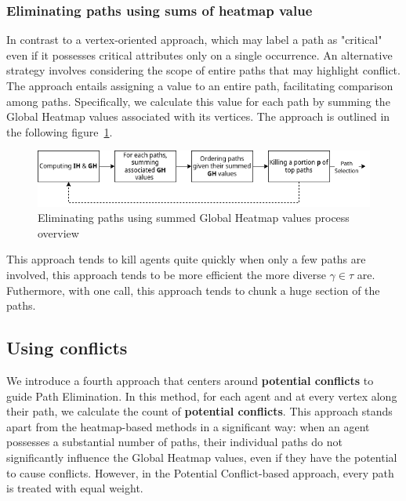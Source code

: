 \subsubsection{Eliminating paths using sums of heatmap value}

In contrast to a vertex-oriented approach, which may label a path as "critical" even if it possesses critical attributes only on a single occurrence. An alternative strategy involves considering the scope of entire paths that may highlight conflict. The approach entails assigning a value to an entire path, facilitating comparison among paths. Specifically, we calculate this value for each path by summing the Global Heatmap values associated with its vertices. The approach is outlined in the following figure~\ref{fig:summed_heatmap_value_elimination}. 

\begin{figure}[H]
    \centering
    \caption{Eliminating paths using summed Global Heatmap values process overview}\label{fig:summed_heatmap_value_elimination}
    \includegraphics[width=\widthimg]{img/summed_heatmap_value.drawio.png}
\end{figure}

This approach tends to kill agents quite quickly when only a few paths are involved, this approach tends to be more efficient the more diverse \(\gamma\in\tau\) are. Futhermore, with one call, this approach tends to chunk a huge section of the paths. 


\subsection{Using conflicts}

We introduce a fourth approach that centers around \textbf{potential conflicts} to guide Path Elimination. In this method, for each agent and at every vertex along their path, we calculate the count of \textbf{potential conflicts}. This approach stands apart from the heatmap-based methods in a significant way: when an agent possesses a substantial number of paths, their individual paths do not significantly influence the Global Heatmap values, even if they have the potential to cause conflicts. However, in the Potential Conflict-based approach, every path is treated with equal weight.

